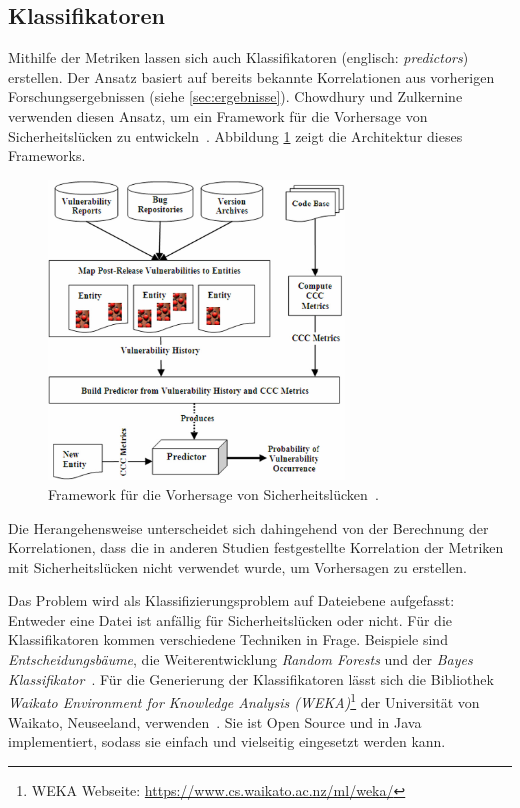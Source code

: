 \subsection{Klassifikatoren}
Mithilfe der Metriken lassen sich auch Klassifikatoren (englisch: \emph{predictors}) erstellen.
Der Ansatz basiert auf bereits bekannte Korrelationen aus vorherigen Forschungsergebnissen (siehe \ref{sec:ergebnisse}).
Chowdhury und Zulkernine verwenden diesen Ansatz, um ein Framework für die Vorhersage von Sicherheitslücken zu entwickeln~\cite{chowdhury_zulkernine_2009}.
Abbildung \ref{fig:framework} zeigt die Architektur dieses Frameworks.
\begin{figure}
	\centering
	\includegraphics[width=0.7\textwidth]{img/framework.png}
	\caption{Framework für die Vorhersage von Sicherheitslücken~\cite{chowdhury_zulkernine_2009}.}
	\label{fig:framework}
\end{figure}
Die Herangehensweise unterscheidet sich dahingehend von der Berechnung der Korrelationen, dass die in anderen Studien festgestellte Korrelation der Metriken mit Sicherheitslücken nicht verwendet wurde, um Vorhersagen zu erstellen.

Das Problem wird als Klassifizierungsproblem auf Dateiebene aufgefasst:
Entweder eine Datei ist anfällig für Sicherheitslücken oder nicht.
Für die Klassifikatoren kommen verschiedene Techniken in Frage.
Beispiele sind \emph{Entscheidungsbäume}, die Weiterentwicklung \emph{Random Forests} und der \emph{Bayes Klassifikator}~\cite{decision_trees}.
Für die Generierung der Klassifikatoren lässt sich die Bibliothek \emph{Waikato Environment for Knowledge Analysis (WEKA)}\footnote{WEKA Webseite: \url{https://www.cs.waikato.ac.nz/ml/weka/}} der Universität von Waikato, Neuseeland, verwenden~\cite{chowdhury_zulkernine_2009}.
Sie ist Open Source und in Java implementiert, sodass sie einfach und vielseitig eingesetzt werden kann.

